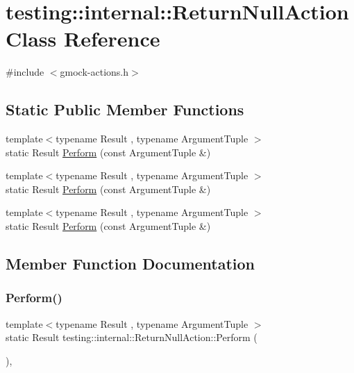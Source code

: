 \hypertarget{classtesting_1_1internal_1_1_return_null_action}{}\section{testing\+::internal\+::Return\+Null\+Action Class Reference}
\label{classtesting_1_1internal_1_1_return_null_action}


{\ttfamily \#include $<$gmock-\/actions.\+h$>$}

\subsection*{Static Public Member Functions}
\begin{DoxyCompactItemize}
\item 
{\footnotesize template$<$typename Result , typename Argument\+Tuple $>$ }\\static Result \mbox{\hyperlink{classtesting_1_1internal_1_1_return_null_action_a6ce1fba236686df93070320b399e4f32}{Perform}} (const Argument\+Tuple \&)
\item 
{\footnotesize template$<$typename Result , typename Argument\+Tuple $>$ }\\static Result \mbox{\hyperlink{classtesting_1_1internal_1_1_return_null_action_a6ce1fba236686df93070320b399e4f32}{Perform}} (const Argument\+Tuple \&)
\item 
{\footnotesize template$<$typename Result , typename Argument\+Tuple $>$ }\\static Result \mbox{\hyperlink{classtesting_1_1internal_1_1_return_null_action_a6ce1fba236686df93070320b399e4f32}{Perform}} (const Argument\+Tuple \&)
\end{DoxyCompactItemize}


\subsection{Member Function Documentation}
\mbox{\label{classtesting_1_1internal_1_1_return_null_action_a6ce1fba236686df93070320b399e4f32}} 
\subsubsection{\texorpdfstring{Perform()}{Perform()}\hspace{0.1cm}{\footnotesize\ttfamily [1/3]}}
{\footnotesize\ttfamily template$<$typename Result , typename Argument\+Tuple $>$ \\
static Result testing\+::internal\+::\+Return\+Null\+Action\+::\+Perform (\begin{DoxyParamCaption}\item[{const Argument\+Tuple \&}]{ }\end{DoxyParamCaption})\hspace{0.3cm}{\ttfamily [inline]}, {\ttfamily [static]}}

